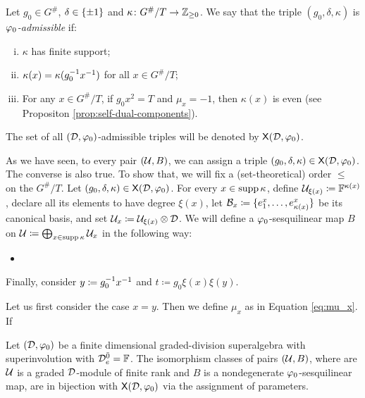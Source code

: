 \begin{defi}
    Let $g_0 \in G^\#$, $\delta \in \{ \pm 1 \}$ and $\kappa\colon G^\#/T \to \mathbb{Z}_{\geq 0}$. 
    We say that the triple $(g_0, \delta, \kappa)$ is \emph{$\varphi_0$-admissible} if:
    \begin{enumerate}[(i)]
        \item $\kappa$ has finite support; \label{item:kappa-finite-support}
        \item $\kappa(x) = \kappa(g_0^{-1} x^{-1})$ for all $x \in G^\#/T$; \label{item:kappa-duality}
        \item For any $x\in G^\#/T$, if $g_0 x^2 = T$ and $\mu_x = -1$, then $\kappa (x)$ is even (see Propositon \ref{prop:self-dual-components}). \label{item:kappa-parity}
    \end{enumerate}
    The set of all $(\mathcal{D}, \varphi_0)$-admissible triples will be denoted by $\mathsf{X}(\mathcal{D}, \varphi_0)$.
\end{defi}

As we have seen, to every pair $(\mathcal U, B)$, we can assign a triple $(g_0, \delta, \kappa) \in \mathsf{X} (\mathcal{D}, \varphi_0)$.
The converse is also true. 
To show that, we will fix a (set-theoretical) order $\leq$ on the $G^\#/T$. 
Let $(g_0, \delta, \kappa) \in \mathsf{X} (\mathcal{D}, \varphi_0)$. 
For every $x \in \operatorname{supp} \kappa$, define $\mathcal U_{\xi(x)} \coloneqq \mathbb{F}^{\kappa(x)}$, declare all its elements to have degree $\xi(x)$, let $\mathcal B_x \coloneqq \{ e_1^x, \ldots, e_{\kappa(x)}^x\}$ be its canonical basis, and set $\mathcal U_x \coloneqq \mathcal U_{\xi(x)} \otimes \mathcal{D}$. 
We will define a $\varphi_0$-sesquilinear map $B$ on $\mathcal U \coloneqq \bigoplus_{x \in \operatorname{supp} \kappa} \mathcal U_x$ in the following way:
\begin{itemize}
    \item 
\end{itemize}
Finally, consider $y \coloneqq g_0^{-1} x^{-1}$ and $t \coloneqq g_0 \xi(x) \xi(y)$. 

Let us first consider the case $x = y$. 
Then we define $\mu_x$ as in Equation \eqref{eq:mu_x}. 
If 

\begin{thm}
    Let $(\mathcal{D}, \varphi_0)$ be a finite dimensional graded-division superalgebra with superinvolution with $\mathcal{D}_e^{\bar0} = \mathbb{F}$. 
    The isomorphism classes of pairs $(\mathcal U, B)$, where are $\mathcal U$ is a graded $\mathcal{D}$-module of finite rank and $B$ is a nondegenerate $\varphi_0$-sesquilinear map, are in bijection with $\mathsf{X} (\mathcal{D}, \varphi_0)$ via the assignment of parameters.
\end{thm}

